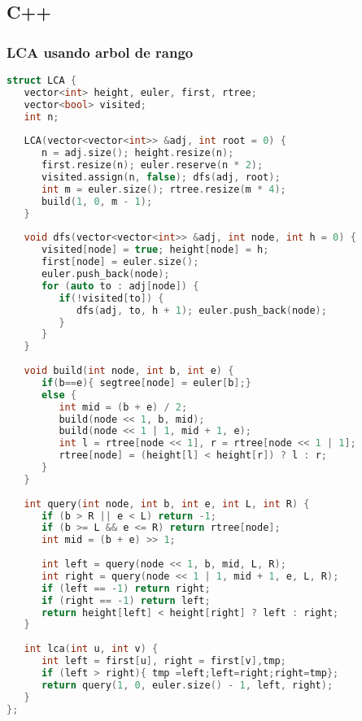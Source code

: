 \subsection{C++}

\subsubsection{LCA usando arbol de rango}
\begin{lstlisting}[language=C++]
struct LCA {
   vector<int> height, euler, first, rtree;
   vector<bool> visited;
   int n;
   
   LCA(vector<vector<int>> &adj, int root = 0) {
      n = adj.size(); height.resize(n);
      first.resize(n); euler.reserve(n * 2);
      visited.assign(n, false); dfs(adj, root);
      int m = euler.size(); rtree.resize(m * 4);
      build(1, 0, m - 1);
   }
	
   void dfs(vector<vector<int>> &adj, int node, int h = 0) {
      visited[node] = true; height[node] = h;
      first[node] = euler.size();
      euler.push_back(node);
      for (auto to : adj[node]) {
         if(!visited[to]) {
            dfs(adj, to, h + 1); euler.push_back(node);
         }
      }
   }
	
   void build(int node, int b, int e) {
      if(b==e){ segtree[node] = euler[b];} 
      else {
         int mid = (b + e) / 2;
         build(node << 1, b, mid); 
         build(node << 1 | 1, mid + 1, e);
         int l = rtree[node << 1], r = rtree[node << 1 | 1];
         rtree[node] = (height[l] < height[r]) ? l : r;
      }
   }
	
   int query(int node, int b, int e, int L, int R) {
      if (b > R || e < L) return -1;
      if (b >= L && e <= R) return rtree[node];
      int mid = (b + e) >> 1;
      
      int left = query(node << 1, b, mid, L, R);
      int right = query(node << 1 | 1, mid + 1, e, L, R);
      if (left == -1) return right;
      if (right == -1) return left;
      return height[left] < height[right] ? left : right;
   }
	
   int lca(int u, int v) {
      int left = first[u], right = first[v],tmp;
      if (left > right){ tmp =left;left=right;right=tmp};
      return query(1, 0, euler.size() - 1, left, right);
   }
};

\end{lstlisting}

